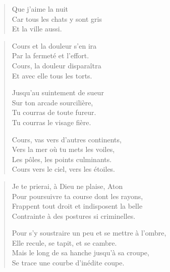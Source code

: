 \begin{verse}\haiku
  Que j’aime la nuit\\  %
  Car tous les chats y sont gris\\  %
  Et la ville aussi.
\end{verse}

\begin{verse}\quatrain
  Cours et la douleur s’en ira\\ 
  Par la fermeté et l’effort.\\ 
  Cours, la douleur disparaîtra\\ 
  Et avec elle tous les torts.  %

  Jusqu’au suintement de sueur\\ 
  Sur ton arcade sourcilière,\\ 
  Tu courras de toute fureur.\\ 
  Tu courras le visage fière.  %

  Cours, vas vers d’autres continents,\\ 
  Vers la mer où tu mets les voiles,\\ 
  Les pôles, les points culminants.\\ 
  Cours vers le ciel, vers les étoiles.  %
\end{verse}

\begin{verse}\quatrain
  Je te prierai, à Dieu ne plaise, Aton%
  \\ 
  Pour poursuivre ta course dont les rayons,\\ 
  Frappent tout droit et indisposent la belle\\ 
  Contrainte à des postures si criminelles.  %

  Pour s’y soustraire un peu et se mettre à l’ombre,\\ 
  Elle recule, se tapit, et se cambre.\\ 
  Mais le long de sa hanche jusqu’à sa croupe,\\ 
  Se trace une courbe d’inédite coupe.  %
\end{verse}

